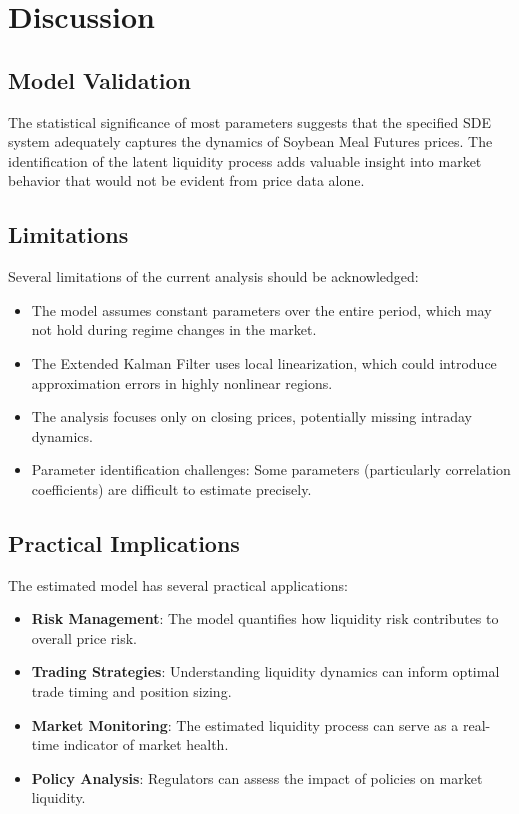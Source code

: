 \documentclass[12pt,a4paper]{article}
\begin{document}
\section{Discussion}

\subsection{Model Validation}

The statistical significance of most parameters suggests that the specified SDE system adequately captures the dynamics of Soybean Meal Futures prices. The identification of the latent liquidity process adds valuable insight into market behavior that would not be evident from price data alone.

\subsection{Limitations}

Several limitations of the current analysis should be acknowledged:

\begin{itemize}
    \item The model assumes constant parameters over the entire period, which may not hold during regime changes in the market.
    
    \item The Extended Kalman Filter uses local linearization, which could introduce approximation errors in highly nonlinear regions.
    
    \item The analysis focuses only on closing prices, potentially missing intraday dynamics.
    
    \item Parameter identification challenges: Some parameters (particularly correlation coefficients) are difficult to estimate precisely.
\end{itemize}

\subsection{Practical Implications}

The estimated model has several practical applications:

\begin{itemize}
    \item \textbf{Risk Management}: The model quantifies how liquidity risk contributes to overall price risk.
    
    \item \textbf{Trading Strategies}: Understanding liquidity dynamics can inform optimal trade timing and position sizing.
    
    \item \textbf{Market Monitoring}: The estimated liquidity process can serve as a real-time indicator of market health.
    
    \item \textbf{Policy Analysis}: Regulators can assess the impact of policies on market liquidity.
\end{itemize}
\end{document}
